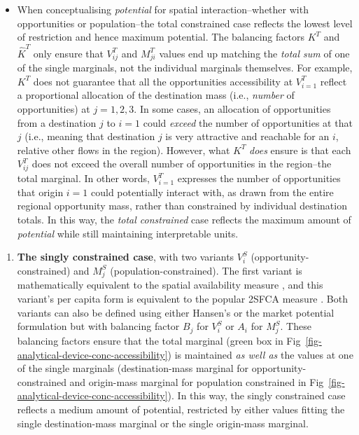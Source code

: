 \documentclass[
  10pt,
  letterpaper,
]{article}
\providecommand{\tightlist}{%
  \setlength{\itemsep}{0pt}\setlength{\parskip}{0pt}}\usepackage{longtable,booktabs,array}
\begin{document}
\begin{itemize}
\tightlist
\item
  When conceptualising \emph{potential} for spatial interaction--whether
  with opportunities or population--the total constrained case reflects
  the lowest level of restriction and hence maximum potential. The
  balancing factors \(K^T\) and \(\hat K^T\) only ensure that
  \(V_{ij}^T\) and \(M_{ji}^T\) values end up matching the \emph{total
  sum} of one of the single marginals, not the individual marginals
  themselves. For example, \(K^T\) does not guarantee that all the
  opportunities accessibility at \(V_{i=1}^T\) reflect a proportional
  allocation of the destination mass (i.e., \emph{number} of
  opportunities) at \(j=1, 2, 3\). In some cases, an allocation of
  opportunities from a destination \(j\) to \(i=1\) could \emph{exceed}
  the number of opportunities at that \(j\) (i.e., meaning that
  destination \(j\) is very attractive and reachable for an \(i\),
  relative other flows in the region). However, what \(K^T\) \emph{does}
  ensure is that each \(V_{ij}^T\) does not exceed the overall number of
  opportunities in the region--the total marginal. In other words,
  \(V_{i=1}^T\) expresses the number of opportunities that origin
  \(i=1\) could potentially interact with, as drawn from the entire
  regional opportunity mass, rather than constrained by individual
  destination totals. In this way, the \emph{total constrained} case
  reflects the maximum amount of \emph{potential} while still
  maintaining interpretable units.
\end{itemize}

\begin{enumerate}
\def\labelenumi{\arabic{enumi}.}
\setcounter{enumi}{2}
\tightlist
\item
  \textbf{The singly constrained case}, with two variants \(V_i^S\)
  (opportunity-constrained) and \(M_j^S\) (population-constrained). The
  first variant is mathematically equivalent to the spatial availability
  measure \citep{soukhovIntroducingSpatialAvailability2023}, and this
  variant's per capita form is equivalent to the popular 2SFCA measure
  \citep{luo2003, shen1998}. Both variants can also be defined using
  either Hansen's \citep{hansen1959} or the market potential formulation
  but with balancing factor \(B_j\) for \(V_i^S\) or \(A_i\) for
  \(M_j^S\). These balancing factors ensure that the total marginal
  (green box in Fig~\ref{fig-analytical-device-conc-accessibility}) is
  maintained \emph{as well as} the values at one of the single marginals
  (destination-mass marginal for opportunity-constrained and origin-mass
  marginal for population constrained in
  Fig~\ref{fig-analytical-device-conc-accessibility}). In this way, the
  singly constrained case reflects a medium amount of potential,
  restricted by either values fitting the single destination-mass
  marginal or the single origin-mass marginal.
\end{enumerate}
\end{document}
